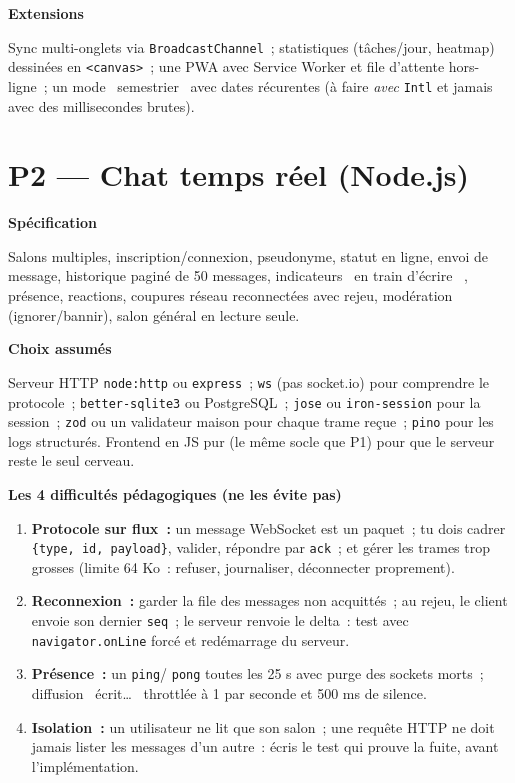 \documentclass[12pt,a4paper,twoside,openright]{book}
\newcommand{\etape}[1]{\par\medskip\noindent\textbf{\large #1}\par\smallskip}
\begin{document}
\etape{Extensions}
Sync multi-onglets via \verb|BroadcastChannel|~; statistiques (t\^aches/jour, heatmap) dessin\'ees en
\verb|<canvas>|~; une PWA avec Service Worker et file d'attente hors-ligne~; un mode \og ~semestrier~ \fg{}
avec dates r\'ecurentes (\`a faire \emph{avec} \verb|Intl| et jamais avec des millisecondes brutes).

\section{P2 --- Chat temps r\'eel (Node.js)}

\etape{Sp\'ecification}
Salons multiples, inscription/connexion, pseudonyme, statut en ligne, envoi de message, historique
pagin\'e de 50 messages, indicateurs \og ~en train d'\'ecrire~ \fg{}, pr\'esence, reactions, coupures r\'eseau
reconnect\'ees avec rejeu, mod\'eration (ignorer/bannir), salon g\'en\'eral en lecture seule.

\etape{Choix assum\'es}
Serveur HTTP \verb|node:http| ou \verb|express|~; \verb|ws| (pas socket.io) pour comprendre le
protocole~; \verb|better-sqlite3| ou PostgreSQL~; \verb|jose| ou \verb|iron-session| pour la session~;
\verb|zod| ou un validateur maison pour chaque trame re\c{c}ue~; \verb|pino| pour les logs structur\'es.
Frontend en JS pur (le m\^eme socle que P1) pour que le serveur reste le seul cerveau.

\etape{Les 4 difficult\'es p\'edagogiques (ne les \'evite pas)}
\begin{enumerate}
  \item \textbf{Protocole sur flux~:} un message WebSocket est un paquet~; tu dois cadrer
        \verb|{type, id, payload}|, valider, r\'epondre par \verb|ack|~; et g\'erer les trames
        trop grosses (limite 64 Ko~: refuser, journaliser, d\'econnecter proprement).
  \item \textbf{Reconnexion~:} garder la file des messages non acquitt\'es~; au rejeu, le client
        envoie son dernier \verb|seq|~; le serveur renvoie le delta~: test avec
        \verb|navigator.onLine| forc\'e et red\'emarrage du serveur.
  \item \textbf{Pr\'esence~:} un \verb|ping|/ \verb|pong| toutes les 25 s avec purge des sockets
        morts~; diffusion \og ~\'ecrit\ldots~ \fg{} throttl\'ee \`a 1 par seconde et 500 ms de silence.
  \item \textbf{Isolation~:} un utilisateur ne lit que son salon~; une requ\^ete HTTP ne doit jamais
        lister les messages d'un autre~: \'ecris le test qui prouve la fuite, avant l'impl\'ementation.
\end{enumerate}
\end{document}
